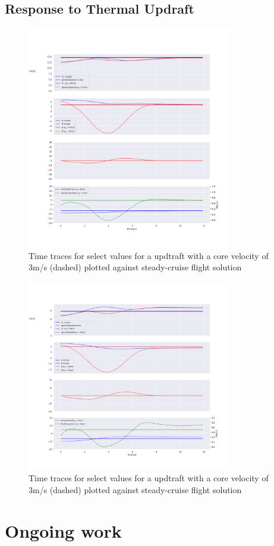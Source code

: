 \documentclass{article}
\begin{document}
\subsection{Response to Thermal Updraft}
\begin{figure}
	\centering
	\includegraphics[width=0.8\textwidth]{time-trace-3ms.png}
	\caption{Time traces for select values for a updtraft with a core velocity of 3m/s (dashed) plotted against steady-cruise flight solution}
	\label{fig:cruise-3m/s gust}
\end{figure}
\begin{figure}
	\centering
	\includegraphics[width=0.8\textwidth]{time-trace-6ms.png}
	\caption{Time traces for select values for a updtraft with a core velocity of 3m/s (dashed) plotted against steady-cruise flight solution}
	\label{fig:cruise-6m/s gust}
\end{figure}

\section{Ongoing work}
\end{document}
